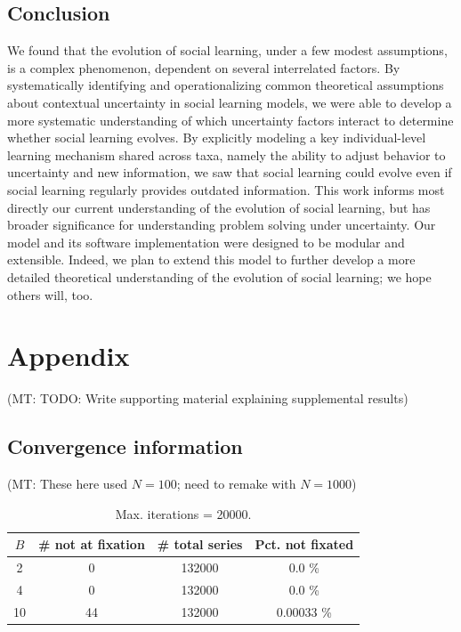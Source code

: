 \documentclass[letterpaper,11.5pt]{scrartcl}
\newcommand{\mt}[1]{{\textcolor{myorange} {({\tiny MT:} #1)}}}
\begin{document}
\subsection{Conclusion}

We found that the evolution of social learning, under a few modest assumptions, is a
complex phenomenon, dependent on several interrelated factors. By systematically
identifying and operationalizing common theoretical assumptions about contextual
uncertainty in social learning models, we were able to develop a more systematic
understanding of which uncertainty factors interact to determine whether social learning
evolves. By explicitly modeling a key individual-level learning mechanism shared across taxa, namely the
ability to adjust behavior to uncertainty and new information, we saw that social
learning could evolve even if social learning regularly provides outdated
information. This work informs most directly our current understanding of the evolution of
social learning, but has broader significance for understanding problem
solving under uncertainty. Our model and its software implementation were
designed to be modular and extensible.  Indeed, we plan to extend this model to further
develop a more detailed theoretical understanding of the evolution of social learning;
we hope others will, too.



% 



\appendix


\section{Appendix}

\mt{TODO: Write supporting material explaining supplemental results}

\subsection{Convergence information}

\mt{These here used $N=100$; need to remake with $N=1000$}

\begin{table}[h] \caption{Max. iterations = 20000.} \label{tab:convergence} \centering
  \begin{tabular}{cccc} \toprule $B$ & \# not at fixation & \# total series & Pct. not fixated
    \\ \midrule  2  & 0  & 132000 & 0.0 \% \\ 4  & 0  & 132000 & 0.0 \% \\ 10 & 44 & 132000 &
    0.00033  \% \\ \bottomrule \end{tabular} \end{table}
\end{document}
